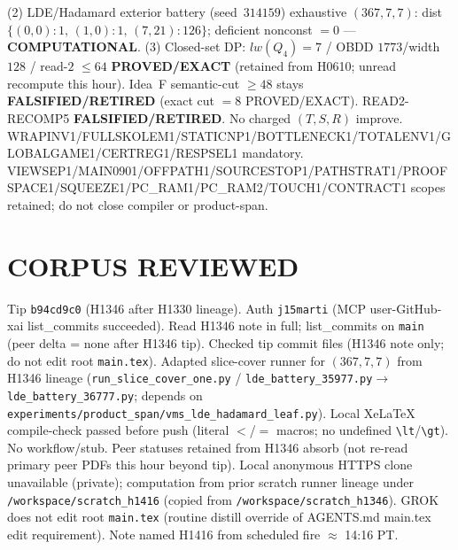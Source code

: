 \documentclass[11pt]{article}
\begin{document}
(2) LDE/Hadamard exterior battery (seed~$314159$) exhaustive $(367,7,7)$:
dist $\{(0,0){:}1,\,(1,0){:}1,\,(7,21){:}126\}$; deficient nonconst $=0$ --- \textbf{COMPUTATIONAL}.
(3) Closed-set DP: $lw(Q_4)=7$ / OBDD $1773$/width $128$ / read-$2$ $\le64$
\textbf{PROVED/EXACT} (retained from H0610; unread recompute this hour).
Idea~F semantic-cut $\ge48$ stays \textbf{FALSIFIED/RETIRED} (exact cut $=8$ PROVED/EXACT).
READ2-RECOMP5 \textbf{FALSIFIED/RETIRED}. No charged $(T,S,R)$ improve.
WRAPINV1/FULLSKOLEM1/STATICNP1/BOTTLENECK1/TOTALENV1/GLOBALGAME1/CERTREG1/RESPSEL1 mandatory.
VIEWSEP1/MAIN0901/OFFPATH1/SOURCESTOP1/PATHSTRAT1/PROOFSPACE1/SQUEEZE1/PC\_RAM1/PC\_RAM2/TOUCH1/CONTRACT1 scopes retained; do not close compiler or product-span.

\section*{CORPUS REVIEWED}
Tip \texttt{b94cd9c0} (H1346 after H1330 lineage). Auth \texttt{j15marti} (MCP user-GitHub-xai list\_commits succeeded).
Read H1346 note in full; list\_commits on \texttt{main} (peer delta = none after H1346 tip).
Checked tip commit files (H1346 note only; do not edit root \texttt{main.tex}).
Adapted slice-cover runner for $(367,7,7)$ from H1346 lineage
(\texttt{run\_slice\_cover\_one.py} / \texttt{lde\_battery\_35977.py}$\to$\texttt{lde\_battery\_36777.py};
depends on \texttt{experiments/product\_span/vms\_lde\_hadamard\_leaf.py}).
Local XeLaTeX compile-check passed before push (literal $<$/$=$ macros; no undefined \texttt{\textbackslash lt}/\texttt{\textbackslash gt}).
No workflow/stub. Peer statuses retained from H1346 absorb (not re-read primary peer PDFs this hour beyond tip).
Local anonymous HTTPS clone unavailable (private);
computation from prior scratch runner lineage under \texttt{/workspace/scratch\_h1416}
(copied from \texttt{/workspace/scratch\_h1346}).
GROK does not edit root \texttt{main.tex} (routine distill override of AGENTS.md main.tex edit requirement).
Note named H1416 from scheduled fire $\approx$ 14:16 PT.
\end{document}
